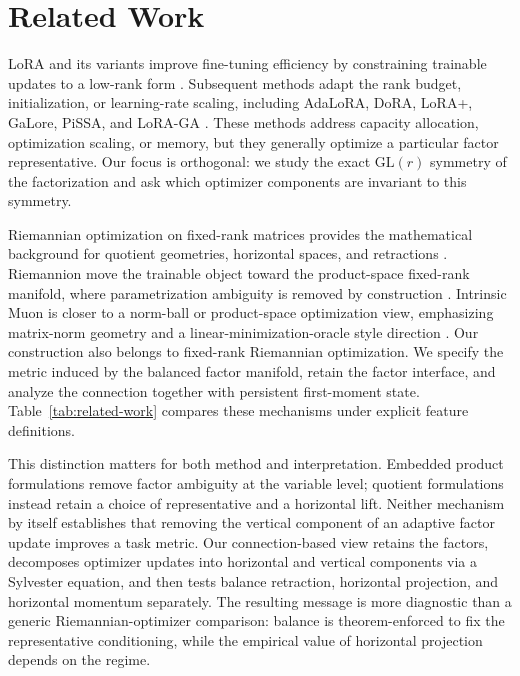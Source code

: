 \section{Related Work}

LoRA and its variants improve fine-tuning efficiency by constraining trainable updates to a low-rank form \cite{hu2022lora}. Subsequent methods adapt the rank budget, initialization, or learning-rate scaling, including AdaLoRA, DoRA, LoRA+, GaLore, PiSSA, and LoRA-GA \cite{zhang2023adalora,liu2024dora,hayou2024loraplus,zhao2024galore,meng2024pissa,wang2024loraga}. These methods address capacity allocation, optimization scaling, or memory, but they generally optimize a particular factor representative. Our focus is orthogonal: we study the exact $\mathrm{GL}(r)$ symmetry of the factorization and ask which optimizer components are invariant to this symmetry.

Riemannian optimization on fixed-rank matrices provides the mathematical background for quotient geometries, horizontal spaces, and retractions \cite{absil2008optimization,mishra2014fixedrank,boumal2023introduction,vandereycken2013completion,bonnabel2013sgd}. Riemannion move the trainable object toward the product-space fixed-rank manifold, where parametrization ambiguity is removed by construction \cite{bogachev2025riemannlora}. Intrinsic Muon is closer to a norm-ball or product-space optimization view, emphasizing matrix-norm geometry and a linear-minimization-oracle style direction \cite{li2026intrinsicmuon}. Our construction also belongs to fixed-rank Riemannian optimization. We specify the metric induced by the balanced factor manifold, retain the factor interface, and analyze the connection together with persistent first-moment state. Table~\ref{tab:related-work} compares these mechanisms under explicit feature definitions.

This distinction matters for both method and interpretation. Embedded product formulations remove factor ambiguity at the variable level; quotient formulations instead retain a choice of representative and a horizontal lift. Neither mechanism by itself establishes that removing the vertical component of an adaptive factor update improves a task metric. Our connection-based view retains the factors, decomposes optimizer updates into horizontal and vertical components via a Sylvester equation, and then tests balance retraction, horizontal projection, and horizontal momentum separately. The resulting message is more diagnostic than a generic Riemannian-optimizer comparison: balance is theorem-enforced to fix the representative conditioning, while the empirical value of horizontal projection depends on the regime.

